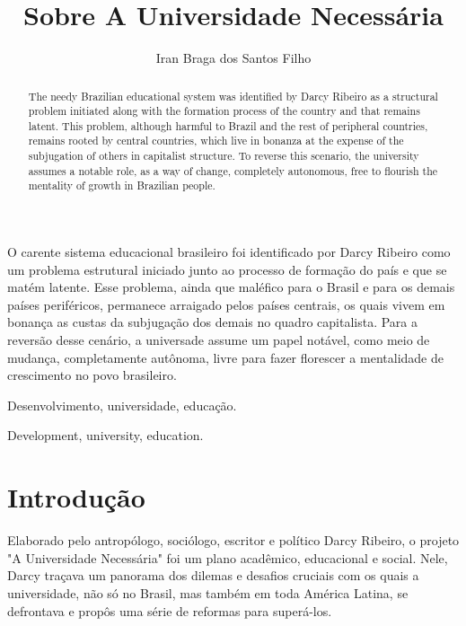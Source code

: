 \documentclass{sbrt}
\begin{document}
\title{Sobre A Universidade Necessária}

\author{Iran Braga dos Santos Filho}

\maketitle

\begin{resumo}
O carente sistema educacional brasileiro foi identificado por Darcy Ribeiro como um problema estrutural iniciado junto ao processo de formação do país e que se matém latente. Esse problema, ainda que maléfico para o Brasil e para os demais países periféricos, permanece arraigado pelos países centrais, os quais vivem em bonança as custas da subjugação dos demais no quadro capitalista. Para a reversão desse cenário, a universade assume um papel notável, como meio de mudança, completamente autônoma, livre para fazer florescer a mentalidade de crescimento no povo brasileiro.
\end{resumo}
\begin{chave}
Desenvolvimento, universidade, educação.
\end{chave}

\begin{abstract}
The needy Brazilian educational system was identified by Darcy Ribeiro as a structural problem initiated along with the formation process of the country and that remains latent. This problem, although harmful to Brazil and the rest of peripheral countries, remains rooted by central countries, which live in bonanza at the expense of the subjugation of others in capitalist structure. To reverse this scenario, the university assumes a notable role, as a way of change, completely autonomous, free to flourish the mentality of growth in Brazilian people.
\end{abstract}
\begin{keywords}
Development, university, education.
\end{keywords}

\section{Introdução}

Elaborado pelo antropólogo, sociólogo, escritor e político Darcy Ribeiro, o projeto "A Universidade Necessária"{} foi um plano acadêmico, educacional e social. Nele, Darcy traçava um panorama dos dilemas e desafios cruciais com os quais a universidade, não só no Brasil, mas também em toda América Latina, se defrontava e propôs uma série de reformas para superá-los.
\end{document}
